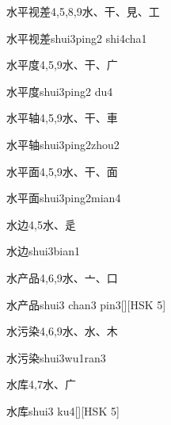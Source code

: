 \begin{entry}{水平视差}{4,5,8,9}{⽔、⼲、⾒、⼯}
  \begin{phonetics}{水平视差}{shui3ping2 shi4cha1}
  \end{phonetics}
\end{entry}

\begin{entry}{水平度}{4,5,9}{⽔、⼲、⼴}
  \begin{phonetics}{水平度}{shui3ping2 du4}
  \end{phonetics}
\end{entry}

\begin{entry}{水平轴}{4,5,9}{⽔、⼲、⾞}
  \begin{phonetics}{水平轴}{shui3ping2zhou2}
  \end{phonetics}
\end{entry}

\begin{entry}{水平面}{4,5,9}{⽔、⼲、⾯}
  \begin{phonetics}{水平面}{shui3ping2mian4}
  \end{phonetics}
\end{entry}

\begin{entry}{水边}{4,5}{⽔、⾡}
  \begin{phonetics}{水边}{shui3bian1}
  \end{phonetics}
\end{entry}

\begin{entry}{水产品}{4,6,9}{⽔、⼇、⼝}
  \begin{phonetics}{水产品}{shui3 chan3 pin3}[][HSK 5]
  \end{phonetics}
\end{entry}

\begin{entry}{水污染}{4,6,9}{⽔、⽔、⽊}
  \begin{phonetics}{水污染}{shui3wu1ran3}
  \end{phonetics}
\end{entry}

\begin{entry}{水库}{4,7}{⽔、⼴}
  \begin{phonetics}{水库}{shui3 ku4}[][HSK 5]
  \end{phonetics}
\end{entry}

